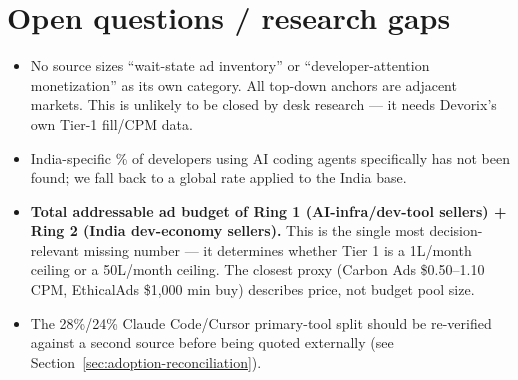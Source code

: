 \section{Open questions / research gaps}
\label{sec:open-questions-market}

\begin{itemize}
  \item No source sizes ``wait-state ad inventory'' or ``developer-attention monetization'' as its own category. All top-down anchors are adjacent markets. This is unlikely to be closed by desk research --- it needs Devorix's own Tier-1 fill/CPM data.
  \item India-specific \% of developers using AI coding agents specifically has not been found; we fall back to a global rate applied to the India base.
  \item \textbf{Total addressable ad budget of Ring 1 (AI-infra/dev-tool sellers) + Ring 2 (India dev-economy sellers).} This is the single most decision-relevant missing number --- it determines whether Tier 1 is a \textrm{\textrupee}1L/month ceiling or a \textrm{\textrupee}50L/month ceiling. The closest proxy (Carbon Ads \$0.50--1.10 CPM, EthicalAds \$1,000 min buy) describes price, not budget pool size.
  \item The 28\%/24\% Claude Code/Cursor primary-tool split should be re-verified against a second source before being quoted externally (see Section~\ref{sec:adoption-reconciliation}).
\end{itemize}
